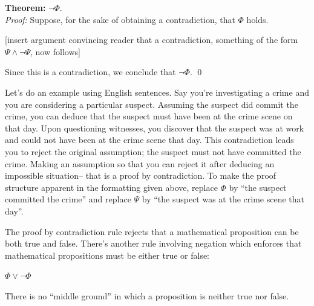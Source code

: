 \documentclass[12pt]{article}
\newcommand{\AND}{\wedge}
\newcommand{\OR}{\vee}
\newcommand{\indented}[1]{\begin{adjustwidth}{1em}{}#1\end{adjustwidth}}
\newcommand{\THM}[2]{\textbf{Theorem:} #1\\[0.5em]\textit{Proof:} #2\qed}
\newcommand{\RULE}[2]{\begin{tcolorbox}[title=#1,colbacktitle=white,coltitle=black,colback=white]#2\end{tcolorbox}}
\def\pA{\Phi}
\def\pB{\Psi}
\begin{document}
\THM{$\neg\pA$.}{
Suppose, for the sake of obtaining a contradiction, that $\pA$ holds.
\indented{[insert argument convincing reader that a contradiction, something of the form $\pB\AND\neg\pB$, now follows]}
Since this is a contradiction, we conclude that $\neg\pA$.
}

Let's do an example using English sentences.
Say you're investigating a crime and you are considering a particular suspect.
Assuming the suspect did commit the crime, you can deduce that the suspect must have been at the crime scene on that day.
Upon questioning witnesses, you discover that the suspect was at work and could not have been at the crime scene that day.
This contradiction leads you to reject the original assumption; the suspect must not have committed the crime.
Making an assumption so that you can reject it after deducing an impossible situation-- that is a proof by contradiction.
To make the proof structure apparent in
the formatting given above, replace
$\pA$ by ``the suspect committed the crime'' and replace $\pB$ by ``the suspect was at the crime scene that day''.


The proof by contradiction rule rejects that a mathematical proposition can be both true and false.
There's
another rule involving negation which
enforces that mathematical propositions must be either true or false:
\RULE{Excluded middle}{
$\pA\OR\neg\pA$
}
There is no ``middle ground'' in which a proposition is neither true nor false.











\end{document}
